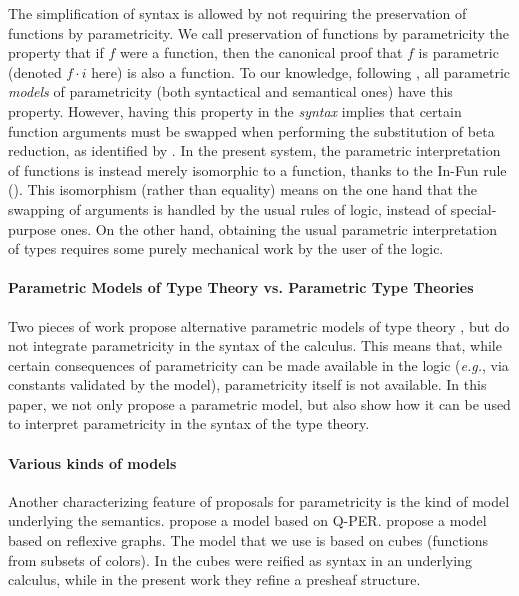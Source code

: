 \documentclass[english]{PaperTools/latex/entcs}
\theoremstyle{plain}
\theoremstyle{definition}
\theoremstyle{remark}
\newcommand\param[1]{\!\cdot\!#1}
\def\eg{\textit{e.g.}}
\begin{document}
The simplification of syntax is allowed by not requiring the preservation
of functions by parametricity. We call preservation of functions by
parametricity the property that if $f$ were a function, then the
canonical proof that $f$ is parametric (denoted $f \param i$ here) is
also a function. To our knowledge, following \citet{reynolds_types_1983}, all parametric \emph{models} of parametricity (both syntactical and semantical ones) have this property.
However, having this property in the \emph{syntax} implies that
certain function arguments must be swapped when performing the
substitution of beta reduction, as identified by
\citet{bernardy_computational_2012}.  In the present system, the
parametric interpretation of functions is instead merely isomorphic to
a function, thanks to the {\sc In-Fun} rule (). This
isomorphism (rather than equality) means on the one hand that the
swapping of arguments is handled by the usual rules of logic, instead
of special-purpose ones. On the other hand, obtaining the usual
parametric interpretation of types requires some purely mechanical
work by the user of the logic.

\paragraph{Parametric Models of Type Theory vs. Parametric Type Theories}
Two pieces of work propose alternative parametric models of
type theory
\citep{atkey_relationally_2014,krishnaswami_internalizing_2013}, but
do not integrate parametricity in the syntax of the calculus. This
means that, while certain consequences of parametricity can be made
available in the logic (\eg, via constants validated by the model),
parametricity itself is not available. In this paper, we not only
propose a parametric model, but also show how it can be used to
interpret parametricity in the syntax of the type theory.


\paragraph{Various kinds of models}
Another characterizing feature of proposals for parametricity is the
kind of model underlying the
semantics.  propose a model
based on Q-PER.  propose a model based
on reflexive graphs. The model that we use is based on cubes
(functions from subsets of colors). In \citet{bernardy_computational_2012}
the cubes were reified as syntax in an underlying calculus, while in the
present work they refine a presheaf structure.
\end{document}
